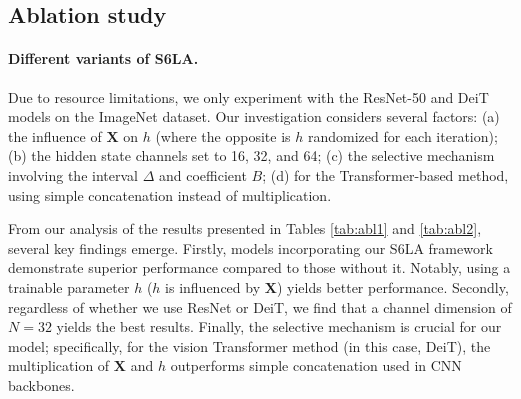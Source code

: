 \vspace{-6pt}

\subsection{Ablation study}
\label{sec:abl}

\paragraph{Different variants of S6LA.} 
Due to resource limitations, we only experiment with the ResNet-50 and DeiT models on the ImageNet dataset. Our investigation considers several factors: (a) the influence of $\boldsymbol{X}$ on $h$ (where the opposite is $h$ randomized for each iteration); (b) the hidden state channels set to 16, 32, and 64; (c) the selective mechanism involving the interval $\Delta$ and coefficient $B$; (d) for the Transformer-based method, using simple concatenation instead of multiplication.

From our analysis of the results presented in Tables \ref{tab:abl1} and \ref{tab:abl2}, several key findings emerge. Firstly, models incorporating our S6LA framework demonstrate superior performance compared to those without it. Notably, using a trainable parameter $h$ ($h$ is influenced by $\boldsymbol{X}$) yields better performance. Secondly, regardless of whether we use ResNet or DeiT, we find that a channel dimension of $N=32$ yields the best results. Finally, the selective mechanism is crucial for our model; specifically, for the vision Transformer method (in this case, DeiT), the multiplication of $\boldsymbol{X}$ and $h$ outperforms simple concatenation used in CNN backbones.

